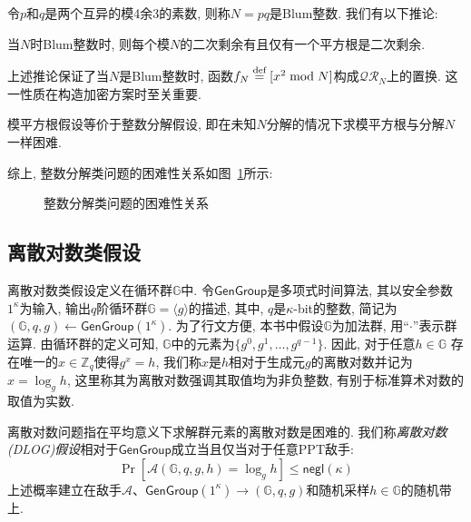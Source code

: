 令$p$和$q$是两个互异的模4余3的素数, 则称$N = pq$是Blum整数. 我们有以下推论: 
\begin{proposition}
当$N$时Blum整数时, 则每个模$N$的二次剩余有且仅有一个平方根是二次剩余.
\end{proposition}
上述推论保证了当$N$是Blum整数时, 函数$f_N \stackrel{\textup{def}}{=} [x^2 \bmod N]$构成$\mathcal{QR}_N$上的置换. 这一性质在构造加密方案时至关重要. 

\begin{remark}
模平方根假设等价于整数分解假设, 即在未知$N$分解的情况下求模平方根与分解$N$一样困难.  
\end{remark}

综上, 整数分解类问题的困难性关系如图~\ref{figure:factoring-type-problems-relation}所示: 
\begin{figure}[!hbtp]
\begin{center}
\end{center}
\caption{整数分解类问题的困难性关系}\label{figure:factoring-type-problems-relation}
\end{figure}

\subsection{离散对数类假设}
离散对数类假设定义在循环群$\mathbb{G}$中. 
令$\mathsf{GenGroup}$是多项式时间算法, 其以安全参数$1^\kappa$为输入, 输出$q$阶循环群$\mathbb{G} = \langle g \rangle$的描述, 
其中, $q$是$\kappa$-bit的整数, 简记为$(\mathbb{G}, q, g) \leftarrow \mathsf{GenGroup}(1^\kappa)$. 
为了行文方便, 本书中假设$\mathbb{G}$为加法群, 用``$\cdot$''表示群运算.  
由循环群的定义可知, $\mathbb{G}$中的元素为$\{g^0, g^1, \dots, g^{q-1}\}$. 因此, 对于任意$h \in \mathbb{G}$
存在唯一的$x \in \mathbb{Z}_q$使得$g^x = h$, 我们称$x$是$h$相对于生成元$g$的离散对数并记为$x = \log_g h$, 
这里称其为离散对数强调其取值均为非负整数, 有别于标准算术对数的取值为实数.  



\begin{definition}[离散对数假设]
离散对数问题指在平均意义下求解群元素的离散对数是困难的. 
我们称\emph{离散对数(DLOG)假设}相对于$\mathsf{GenGroup}$成立当且仅当对于任意PPT敌手: 
\begin{equation*}
\Pr[\mathcal{A}(\mathbb{G}, q, g, h) = \log_g h] \leq \mathsf{negl}(\kappa)
\end{equation*} 
上述概率建立在敌手$\mathcal{A}$、$\mathsf{GenGroup}(1^\kappa) \rightarrow (\mathbb{G}, q, g)$和随机采样$h \in \mathbb{G}$的随机带上. 
\end{definition}


